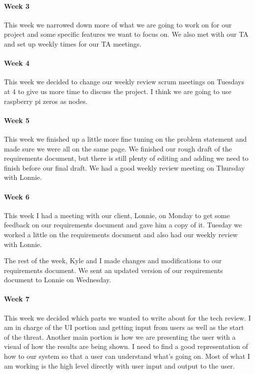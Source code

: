 \documentclass[draftclsnofoot, onecolumn, compsoc, 10pt]{IEEEtran}
\begin{document}
\paragraph{Week 3}
This week we narrowed down more of what we are going to work on for our project and some specific features we want to focus on. We also met with our TA and set up weekly times for our TA meetings. 
\paragraph{Week 4}
This week we decided to change our weekly review scrum meetings on Tuesdays at 4 to give us more time to discuss the project. I think we are going to use raspberry pi zeros as nodes.   
\paragraph{Week 5}
This week we finished up a little more fine tuning on the problem statement and made sure we were all on the same page. We finished our rough draft of the requirements document, but there is still plenty of editing and adding we need to finish before our final draft. We had a good weekly review meeting on Thursday with Lonnie.
\paragraph{Week 6}
This week I had a meeting with our client, Lonnie, on Monday to get some feedback on our requirements document and gave him a copy of it.  
Tuesday we worked a little on the requirements document and also had our weekly review with Lonnie.  

The rest of the week, Kyle and I made changes and modifications to our requirements document. We sent an updated version of our requirements document to Lonnie on Wednesday.
\paragraph{Week 7}
This week we decided which parts we wanted to write about for the tech review. I am in charge of the UI portion and getting input from users as well as the start of the threat. Another main portion is how we are presenting the user with a visual of how the results are being shown. I need to find a good representation of how to our system so that a user can understand what's going on. Most of what I am working is the high level directly with user input and output to the user.  
\end{document}
